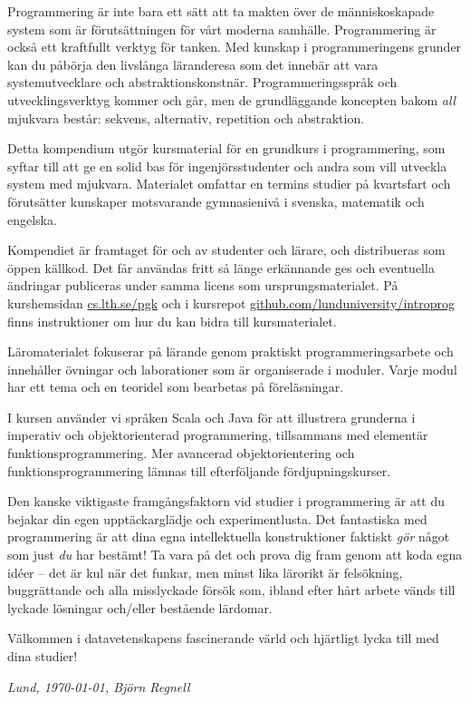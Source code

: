 


Programmering är inte bara ett sätt att ta makten över de människoskapade system som är förutsättningen för vårt moderna samhälle. Programmering är också ett kraftfullt verktyg för tanken. Med kunskap i programmeringens grunder kan du påbörja den livslånga läranderesa som det innebär att vara systemutvecklare och abstraktionskonstnär. Programmeringsspråk och utvecklingsverktyg kommer och går, men de grundläggande koncepten bakom \emph{all} mjukvara består: sekvens, alternativ, repetition och abstraktion. 

Detta kompendium utgör kursmaterial för en grundkurs i programmering, som syftar till att ge en solid bas för ingenjörsstudenter och andra som vill utveckla system med mjukvara. Materialet omfattar en termins studier på kvartsfart och förutsätter kunskaper motsvarande gymnasienivå i svenska, matematik och engelska. 

Kompendiet är framtaget för och av studenter och lärare, och distribueras som öppen källkod. Det får användas fritt så länge erkännande ges och eventuella ändringar publiceras under samma licens som ursprungsmaterialet. På kurshemsidan \href{http://cs.lth.se/pgk}{cs.lth.se/pgk} och i kursrepot \href{http://github.com/lunduniversity/introprog}{github.com/lunduniversity/introprog} finns instruktioner om hur du kan bidra till kursmaterialet.

Läromaterialet fokuserar på lärande genom praktiskt programmeringsarbete och innehåller övningar och laborationer som är organiserade i moduler. Varje modul har ett tema och en teoridel som bearbetas på föreläsningar. 

I kursen använder vi språken Scala och Java för att illustrera grunderna i imperativ och objektorienterad programmering, tillsammans med elementär funktionsprogrammering. Mer avancerad objektorientering och funktionsprogrammering lämnas till efterföljande fördjupningskurser. 

Den kanske viktigaste framgångsfaktorn vid studier i programmering är att du bejakar din egen upptäckarglädje och experimentlusta. Det fantastiska med programmering är att dina egna intellektuella konstruktioner faktiskt \emph{gör} något som just \emph{du} har bestämt! Ta vara på det och prova dig fram genom att koda egna idéer -- det är kul när det funkar, men minst lika lärorikt är felsökning, buggrättande och alla misslyckade försök som, ibland efter hårt arbete vänds till lyckade lösningar och/eller bestående lärdomar. 

Välkommen i datavetenskapens fascinerande värld och hjärtligt lycka till med dina studier!

\vspace{1em}\noindent \textit{\hfill Lund, \today, Björn Regnell}



